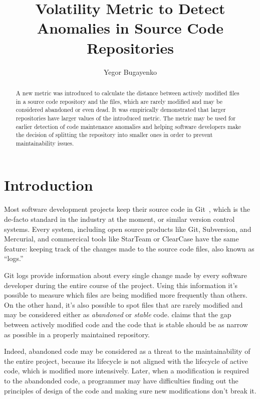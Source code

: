 \documentclass[sigplan,10pt,nonacm=true]{acmart}
\title{Volatility Metric to Detect Anomalies in Source Code Repositories}
\author{Yegor Bugayenko}{}{}
\affiliation{\institution{}\city{Moscow}\country{Russia}}
\begin{document}
\begin{abstract}
A new metric was introduced to calculate the distance
between actively modified files in a source code repository
and the files, which are rarely modified and may be considered
abandoned or even dead. It was empirically demonstrated that larger repositories
have larger values of the introduced metric.
The metric may be used for earlier detection of code maintenance anomalies
and helping software developers make the decision of splitting the repository
into smaller ones in order to prevent maintainability issues.
\end{abstract}
\maketitle

\section{Introduction}

Most software development projects keep their source code in Git~\citep{loeliger2012},
which is the de-facto standard in the industry at the moment, or similar
version control systems. Every system, including open
source products like Git, Subversion, and Mercurial, and commercical tools
like StarTeam\texttrademark{} or ClearCase\texttrademark{}
have the same feature: keeping track of the changes
made to the source code files, also known as ``logs.''

Git logs provide information about every single change made by every software
developer during the entire course of the project. Using this information
it's possible to measure which files are being modified more frequently than others.
On the other hand, it's also possible to spot files that are rarely modified and may
be considered either as \emph{abandoned} or \emph{stable} code.
\citet{fontana2014} claims that the gap between actively modified code
and the code that is stable should be as narrow as possible in a properly
maintained repository.

Indeed, abandoned code may be considered as a threat
to the maintainability of the entire project, because its lifecycle
is not aligned with the lifecycle of active code, which is modified more intensively.
Later, when a modification is required to the abandonded code, a programmer
may have difficulties finding out the principles of design of the code and
making sure new modifications don't break it.
\end{document}

